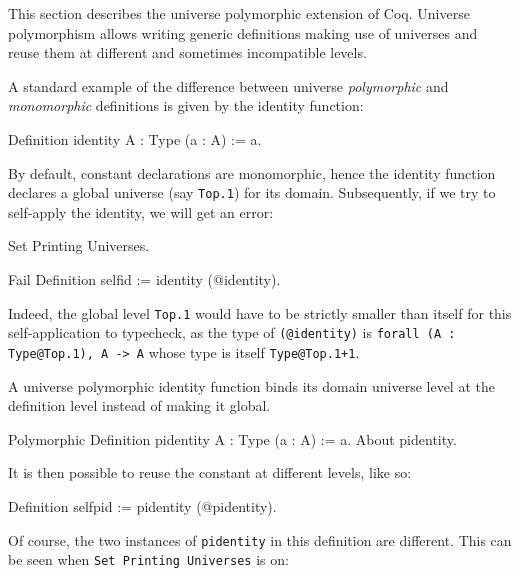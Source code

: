 
\label{Universes-full}


This section describes the universe polymorphic extension of Coq.
Universe polymorphism allows writing generic definitions making use of
universes and reuse them at different and sometimes incompatible levels.

A standard example of the difference between universe \emph{polymorphic} and
\emph{monomorphic} definitions is given by the identity function:

\begin{coq_example*}
Definition identity {A : Type} (a : A) := a.
\end{coq_example*}

By default, constant declarations are monomorphic, hence the identity
function declares a global universe (say \texttt{Top.1}) for its
domain. Subsequently, if we try to self-apply the identity, we will get
an error:

\begin{coq_eval}
Set Printing Universes.
\end{coq_eval}
\begin{coq_example}
Fail Definition selfid := identity (@identity).
\end{coq_example}

Indeed, the global level \texttt{Top.1} would have to be strictly smaller than itself
for this self-application to typecheck, as the type of \texttt{(@identity)} is
\texttt{forall (A : Type@{Top.1}), A -> A} whose type is itself \texttt{Type@{Top.1+1}}.

A universe polymorphic identity function binds its domain universe level
at the definition level instead of making it global.

\begin{coq_example}
Polymorphic Definition pidentity {A : Type} (a : A) := a.
About pidentity.
\end{coq_example}

It is then possible to reuse the constant at different levels, like so:

\begin{coq_example}
Definition selfpid := pidentity (@pidentity).
\end{coq_example}

Of course, the two instances of \texttt{pidentity} in this definition
are different. This can be seen when \texttt{Set Printing Universes} is
on:

